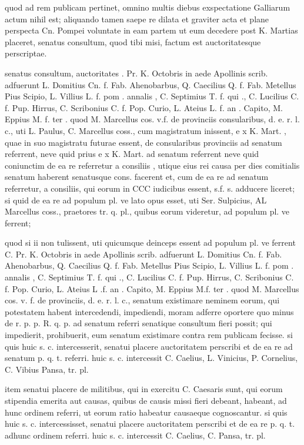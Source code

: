  quod ad rem publicam pertinet, omnino multis diebus exspectatione Galliarum actum nihil est; aliquando tamen saepe re dilata et graviter acta et plane perspecta Cn. Pompei voluntate in eam partem ut eum decedere post K. Martias placeret, senatus consultum, quod tibi misi, factum est auctoritatesque perscriptae.

 senatus consultum, auctoritates . Pr. K. Octobris in aede Apollinis scrib. adfuerunt L. Domitius Cn. f. Fab. Ahenobarbus, Q. Caecilius Q. f. Fab. Metellus Pius Scipio, L. Villius L. f. pom . annalis , C. Septimius T. f. qui ., C. Lucilius C. f. Pup. Hirrus, C. Scribonius C. f. Pop. Curio, L. Ateius L. f. an . Capito, M. Eppius M. f. ter . quod M. Marcellus cos. v.f. de provinciis consularibus, d. e. r. l. c., uti L. Paulus, C. Marcellus coss., cum magistratum inissent, e x K. Mart. , quae in suo magistratu futurae essent, de consularibus provinciis ad senatum referrent, neve quid prius e x K. Mart. ad senatum referrent neve quid coniunctim de ea re referretur a consiliis , utique eius rei causa per dies comitialis senatum haberent senatusque cons. facerent et, cum de ea re ad senatum referretur, a consiliis, qui eorum in CCC iudicibus essent, s.f. s. adducere liceret; si quid de ea re ad populum pl. ve lato opus esset, uti Ser. Sulpicius, AL Marcellus coss., praetores tr. q. pl., quibus eorum videretur, ad populum pl. ve ferrent;

 quod si ii non tulissent, uti quicumque deinceps essent ad populum pl. ve ferrent C. Pr. K. Octobris in aede Apollinis scrib. adfuerunt L. Domitius Cn. f. Fab. Ahenobarbus, Q. Caecilius Q. f. Fab. Metellus Pius Scipio, L. Villius L. f. pom . annalis , C. Septimius T. f. qui ., C. Lucilius C. f. Pup. Hirrus, C. Scribonius C. f. Pop. Curio, L. Ateius L .f. an . Capito, M. Eppius M.f. ter . quod M. Marcellus cos. v. f. de provinciis, d. e. r. l. c., senatum existimare neminem eorum, qui potestatem habent intercedendi, impediendi, moram adferre oportere quo minus de r. p. p. R. q. p. ad senatum referri senatique consultum fieri possit; qui impedierit, prohibuerit, eum senatum existimare contra rem publicam fecisse. si quis huic s. c. intercesserit, senatui placere auctoritatem perscribi et de ea re ad senatum p. q. t. referri. huic s. c. intercessit C. Caelius, L. Vinicius, P. Cornelius, C. Vibius Pansa, tr. pl.

 item senatui placere de militibus, qui in exercitu C. Caesaris sunt, qui eorum stipendia emerita aut causas, quibus de causis missi fieri debeant, habeant, ad hunc ordinem referri, ut eorum ratio habeatur causaeque cognoscantur. si quis huic s. c. intercessisset, senatui placere auctoritatem perscribi et de ea re p. q. t. adhunc ordinem referri. huic s. c. intercessit C. Caelius, C. Pansa, tr. pl.

